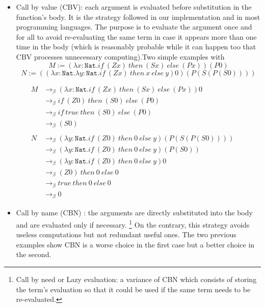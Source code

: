 \documentclass{article}
\begin{document}
    \begin{itemize}
        \item Call by value (CBV): each argument is evaluated before substitution in the function's body. It is the strategy followed in our implementation and in most programming languages. The purpose is to evaluate the argument once and for all to avoid re-evaluating the same term in case it appears more than one time in the body (which is reasonably probable while it can happen too that CBV processes unnecessary computing).Two simple examples with 
        $$M :=  (\lambda x : \texttt{Nat}.if \ (Z x) \ then \ (S x) \ else \ (P x)) (P 0)$$
        $$N := ((\lambda x : \texttt{Nat}.\lambda y : \texttt{Nat}.if \ (Z x) \ then \ x \ else \ y ) 0) (P (S (P (S 0))))$$
    \end{itemize}
    \begin{align*}
            M &\rightarrow_\beta
            (\lambda x : \texttt{Nat}.if \ (Z x) \ then \ (S x) \ else \ (P x)) 0\\ &\rightarrow_\beta
            if \ (Z 0) \ then \ (S 0) \ else \ (P 0)\\ &\rightarrow_\beta
            if \ true \ then \ (S 0) \ else \ (P 0)\\ &\rightarrow_\beta
            (S 0)\\\\
            N &\rightarrow_\beta
           (\lambda y : \texttt{Nat}.if \ (Z 0) \ then \ 0 \ else \ y ) (P (S (P (S 0))))\\ &\rightarrow_\beta
           (\lambda y : \texttt{Nat}.if \ (Z 0) \ then \ 0 \ else \ y ) (P (S 0))\\ &\rightarrow_\beta
           (\lambda y : \texttt{Nat}.if \ (Z 0) \ then \ 0 \ else \ y ) 0\\ &\rightarrow_\beta
           (Z 0) \ then \ 0 \ else \ 0\\ &\rightarrow_\beta
           true \ then \ 0 \ else \ 0\\ &\rightarrow_\beta
           0
        \end{align*}
     \begin{itemize}
         \item Call by name (CBN) : the arguments are directly substituted into the body and are evaluated only if necessary.
         \footnote{Call by need or Lazy evaluation: a variance of CBN which consists of storing the term's evaluation so that it could be used if the same term needs to be re-evaluated.}
         On the contrary, this strategy avoids useless computations but not redundant useful ones. The two previous examples show CBN is a worse choice in the first case but a better choice in the second.
     \end{itemize}
\end{document}
